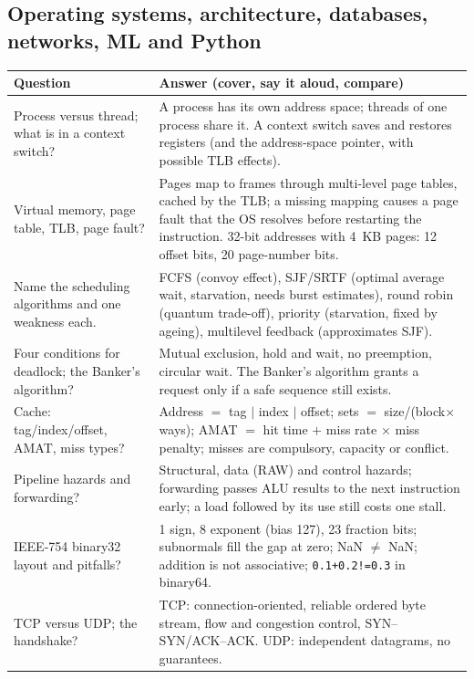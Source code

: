 \documentclass[10pt,a4paper,openany,oneside]{report}
\begin{document}
\subsection{Operating systems, architecture, databases, networks, ML and Python}
\begin{center}\small
\begin{xltabular}{\textwidth}{@{}L{4.6cm}Y@{}}
\toprule
\textbf{Question} & \textbf{Answer (cover, say it aloud, compare)}\\
\midrule\endhead
Process versus thread; what is in a context switch? & A process has its own address space; threads of one process share it. A context switch saves and restores registers (and the address-space pointer, with possible TLB effects).\\
Virtual memory, page table, TLB, page fault? & Pages map to frames through multi-level page tables, cached by the TLB; a missing mapping causes a page fault that the OS resolves before restarting the instruction. 32-bit addresses with 4~KB pages: 12 offset bits, 20 page-number bits.\\
Name the scheduling algorithms and one weakness each. & FCFS (convoy effect), SJF/SRTF (optimal average wait, starvation, needs burst estimates), round robin (quantum trade-off), priority (starvation, fixed by ageing), multilevel feedback (approximates SJF).\\
Four conditions for deadlock; the Banker's algorithm? & Mutual exclusion, hold and wait, no preemption, circular wait. The Banker's algorithm grants a request only if a safe sequence still exists.\\
Cache: tag/index/offset, AMAT, miss types? & Address $=$ tag $|$ index $|$ offset; sets $=$ size/(block$\times$ways); AMAT $=$ hit time $+$ miss rate $\times$ miss penalty; misses are compulsory, capacity or conflict.\\
Pipeline hazards and forwarding? & Structural, data (RAW) and control hazards; forwarding passes ALU results to the next instruction early; a load followed by its use still costs one stall.\\
IEEE-754 binary32 layout and pitfalls? & 1 sign, 8 exponent (bias 127), 23 fraction bits; subnormals fill the gap at zero; NaN $\ne$ NaN; addition is not associative; \texttt{0.1+0.2!=0.3} in binary64.\\
TCP versus UDP; the handshake? & TCP: connection-oriented, reliable ordered byte stream, flow and congestion control, SYN--SYN/ACK--ACK. UDP: independent datagrams, no guarantees.\\

\end{xltabular}
\end{center}
\end{document}

